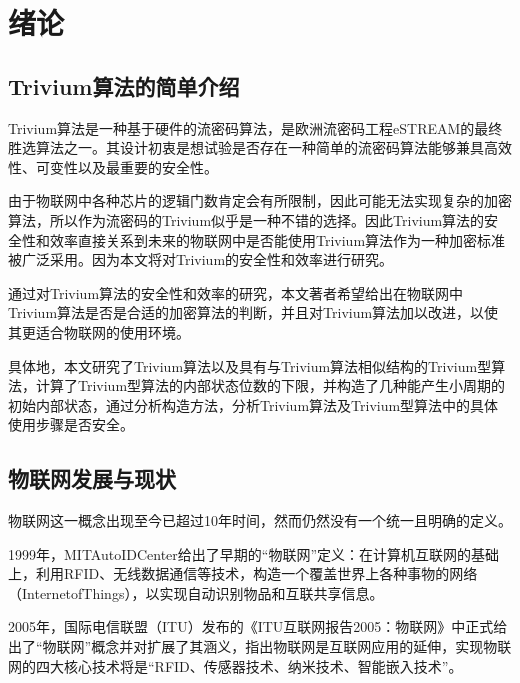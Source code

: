 
\chapter{绪论}
\label{chap:introduction}

\section{Trivium算法的简单介绍}

Trivium算法是一种基于硬件的流密码算法，是欧洲流密码工程eSTREAM的最终胜选算法之一。其设计初衷是想试验是否存在一种简单的流密码算法能够兼具高效性、可变性以及最重要的安全性。

由于物联网中各种芯片的逻辑门数肯定会有所限制，因此可能无法实现复杂的加密算法，所以作为流密码的Trivium似乎是一种不错的选择。因此Trivium算法的安全性和效率直接关系到未来的物联网中是否能使用Trivium算法作为一种加密标准被广泛采用。因为本文将对Trivium的安全性和效率进行研究。

通过对Trivium算法的安全性和效率的研究，本文著者希望给出在物联网中Trivium算法是否是合适的加密算法的判断，并且对Trivium算法加以改进，以使其更适合物联网的使用环境。

具体地，本文研究了Trivium算法以及具有与Trivium算法相似结构的Trivium型算法，计算了Trivium型算法的内部状态位数的下限，并构造了几种能产生小周期的初始内部状态，通过分析构造方法，分析Trivium算法及Trivium型算法中的具体使用步骤是否安全。


\section{物联网发展与现状}

物联网这一概念出现至今已超过10年时间，然而仍然没有一个统一且明确的定义。

1999年，MITAutoIDCenter给出了早期的“物联网”定义：在计算机互联网的基础上，利用RFID、无线数据通信等技术，构造一个覆盖世界上各种事物的网络（InternetofThings），以实现自动识别物品和互联共享信息\parencite{宁焕生2010全球物联网发展及中国物联网建设若干思考}。

2005年，国际电信联盟（ITU）发布的《ITU互联网报告2005：物联网》中正式给出了“物联网”概念并对扩展了其涵义，指出物联网是互联网应用的延伸，实现物联网的四大核心技术将是“RFID、传感器技术、纳米技术、智能嵌入技术”\parencite{宁焕生2010全球物联网发展及中国物联网建设若干思考}。

